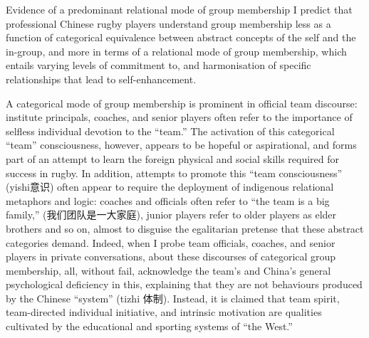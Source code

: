 \documentclass[12pt]{report}
\begin{document}
Evidence of a predominant relational mode of group membership
I predict that professional Chinese rugby players understand group membership less as a function of categorical equivalence between abstract concepts of the self and the in-group, and more in terms of a relational mode of group membership, which entails varying levels of commitment to, and harmonisation of specific relationships that lead to self-enhancement.

A categorical mode of group membership is prominent in official team discourse: institute principals, coaches, and senior players often refer to the importance of selfless individual devotion to the “team.”  The activation of this categorical “team” consciousness, however, appears to be hopeful or aspirational, and forms part of an attempt to learn the foreign physical and social skills required for success in rugby.  In addition, attempts to promote this “team consciousness” (yishi意识) often appear to require the deployment of indigenous relational metaphors and logic: coaches and officials often refer to “the team is a big family,” (我们团队是一大家庭), junior players refer to older players as elder brothers and so on,  almost to disguise the egalitarian pretense that these abstract categories demand.  Indeed, when I probe team officials, coaches, and senior players in private conversations, about these discourses of categorical group membership, all, without fail, acknowledge the team’s and China’s general psychological deficiency in this, explaining that they are not behaviours produced by the Chinese “system” (tizhi 体制).  Instead, it is claimed that team spirit, team-directed individual initiative, and intrinsic motivation are qualities cultivated by the educational and sporting systems of “the West.”
\end{document}
